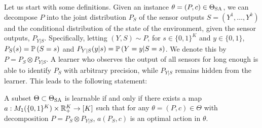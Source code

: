 Let us start with some definitions.
Given an instance $\theta = (P,c)\in \Theta_{\mathrm{SA}}$, we can decompose $P$ into the joint distribution $P_S$ of the sensor outputs $S = (Y^1,\dots,Y^k)$ and the conditional distribution of the state of the environment, given the sensor outputs, $P_{Y|S}$.
Specifically, letting $(Y,S)\sim P$, for $s\in \{0,1\}^K$ and $y\in \{0,1\}$, $P_S(s) = \mathbb{P}\left(S = s\right)$ and $P_{Y|S}(y|s) = \mathbb{P}\left(Y=y|S=s\right)$. We denote this by $P = P_S \otimes P_{Y|S}$.
A learner who observes the output of all sensors for long enough is able to identify 
$P_S$ with arbitrary precision, while $P_{Y|S}$ remains hidden from the learner.
 This leads to the following statement:
\begin{prop}
\label{prop:learnablemap}
A subset $\Theta\subset \Theta_{\mathrm{SA}}$ is learnable 
if and only if there exists a map $a: M_1( \{0,1\}^K )\times \mathbb{R}_+^K \to [K]$ such that 
for any $\theta= (P,c)\in \Theta$ 
with decomposition $P = P_S \otimes P_{Y|S}$, $a(P_S,c)$ is an optimal action in $\theta$.
\end{prop}
